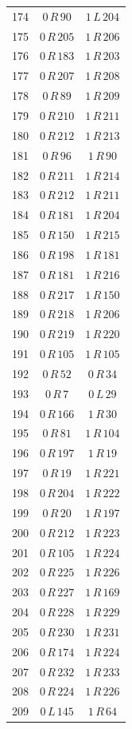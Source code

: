 \begin{longtable}{rcc}
174 & $0\,R\,90$ & $1\,L\,204$\\
175 & $0\,R\,205$ & $1\,R\,206$\\
176 & $0\,R\,183$ & $1\,R\,203$\\
177 & $0\,R\,207$ & $1\,R\,208$\\
178 & $0\,R\,89$ & $1\,R\,209$\\
179 & $0\,R\,210$ & $1\,R\,211$\\
180 & $0\,R\,212$ & $1\,R\,213$\\
181 & $0\,R\,96$ & $1\,R\,90$\\
182 & $0\,R\,211$ & $1\,R\,214$\\
183 & $0\,R\,212$ & $1\,R\,211$\\
184 & $0\,R\,181$ & $1\,R\,204$\\
185 & $0\,R\,150$ & $1\,R\,215$\\
186 & $0\,R\,198$ & $1\,R\,181$\\
187 & $0\,R\,181$ & $1\,R\,216$\\
188 & $0\,R\,217$ & $1\,R\,150$\\
189 & $0\,R\,218$ & $1\,R\,206$\\
190 & $0\,R\,219$ & $1\,R\,220$\\
191 & $0\,R\,105$ & $1\,R\,105$\\
192 & $0\,R\,52$ & $0\,R\,34$\\
193 & $0\,R\,7$ & $0\,L\,29$\\
194 & $0\,R\,166$ & $1\,R\,30$\\
195 & $0\,R\,81$ & $1\,R\,104$\\
196 & $0\,R\,197$ & $1\,R\,19$\\
197 & $0\,R\,19$ & $1\,R\,221$\\
198 & $0\,R\,204$ & $1\,R\,222$\\
199 & $0\,R\,20$ & $1\,R\,197$\\
200 & $0\,R\,212$ & $1\,R\,223$\\
201 & $0\,R\,105$ & $1\,R\,224$\\
202 & $0\,R\,225$ & $1\,R\,226$\\
203 & $0\,R\,227$ & $1\,R\,169$\\
204 & $0\,R\,228$ & $1\,R\,229$\\
205 & $0\,R\,230$ & $1\,R\,231$\\
206 & $0\,R\,174$ & $1\,R\,224$\\
207 & $0\,R\,232$ & $1\,R\,233$\\
208 & $0\,R\,224$ & $1\,R\,226$\\
209 & $0\,L\,145$ & $1\,R\,64$\\

\end{longtable}
